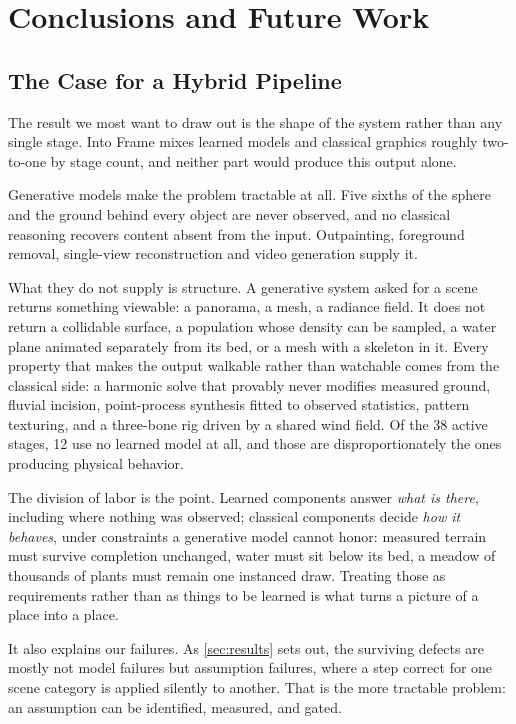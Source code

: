\section{Conclusions and Future Work}
\label{sec:conclusions}

\subsection{The Case for a Hybrid Pipeline}

The result we most want to draw out is the shape of the system rather than any
single stage. Into Frame mixes learned models and classical graphics roughly
two-to-one by stage count, and neither part would produce this output alone.

Generative models make the problem tractable at all. Five sixths of the sphere and
the ground behind every object are never observed, and no classical reasoning
recovers content absent from the input. Outpainting, foreground removal,
single-view reconstruction and video generation supply it.

What they do not supply is structure. A generative system asked for a scene returns
something viewable: a panorama, a mesh, a radiance field. It does not return a
collidable surface, a population whose density can be sampled, a water plane
animated separately from its bed, or a mesh with a skeleton in it. Every property
that makes the output walkable rather than watchable comes from the classical side:
a harmonic solve that provably never modifies measured ground, fluvial incision,
point-process synthesis fitted to observed statistics, pattern texturing, and a
three-bone rig driven by a shared wind field. Of the 38 active stages, 12 use no
learned model at all, and those are disproportionately the ones producing physical
behavior.

The division of labor is the point. Learned components answer \emph{what is there},
including where nothing was observed; classical components decide \emph{how it
behaves}, under constraints a generative model cannot honor: measured terrain must
survive completion unchanged, water must sit below its bed, a meadow of thousands
of plants must remain one instanced draw. Treating those as requirements rather
than as things to be learned is what turns a picture of a place into a place.

It also explains our failures. As \cref{sec:results} sets out, the surviving defects
are mostly not model failures but assumption failures, where a step correct for one
scene category is applied silently to another. That is the more tractable problem:
an assumption can be identified, measured, and gated.

